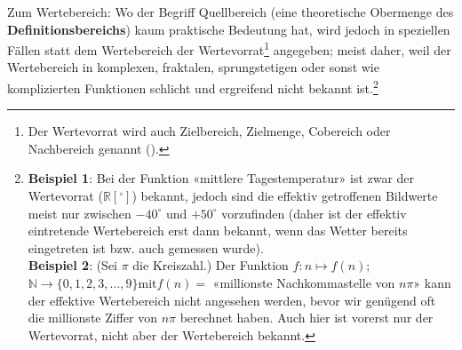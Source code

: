 \begin{bemerkung}{}{}
  Zum Wertebereich: Wo der Begriff Quellbereich (eine theoretische Obermenge
  des \textbf{Definitionsbereichs}) kaum praktische Bedeutung hat,
  wird jedoch in speziellen Fällen statt dem Wertebereich der
  Wertevorrat\footnote{Der Wertevorrat
    wird auch Zielbereich, Zielmenge,
    Cobereich oder Nachbereich
    genannt (\cite{FormelnUndTafeln19}).}
  angegeben; meist daher, weil der
  Wertebereich in komplexen, fraktalen, sprungstetigen oder sonst wie komplizierten Funktionen schlicht
  und ergreifend nicht bekannt ist.\footnote{\textbf{Beispiel 1}: Bei der Funktion
    «mittlere Tagestemperatur» ist zwar der Wertevorrat ($\mathbb{R}[{}^\circ]$)
    bekannt, jedoch sind die effektiv getroffenen Bildwerte meist nur
    zwischen $-40^\circ$ und $+50^\circ$ vorzufinden (daher ist der
    effektiv eintretende Wertebereich erst dann bekannt, wenn das Wetter
    bereits eingetreten ist bzw. auch gemessen wurde). \\
    \textbf{Beispiel 2}: (Sei $\pi$ die Kreiszahl.) Der Funktion $f: n\mapsto f(n)$; $\mathbb{N} \rightarrow \{0, 1, 2, 3, ..., 9\} \text{mit} f(n) = $
    «millionste Nachkommastelle von $n\pi$»
    kann der effektive Wertebereich nicht
  angesehen werden, bevor wir genügend oft die millionste Ziffer von
  $n\pi$ berechnet haben. Auch hier ist vorerst nur der Wertevorrat, nicht
  aber der Wertebereich bekannt.}
\end{bemerkung}






\newpage


